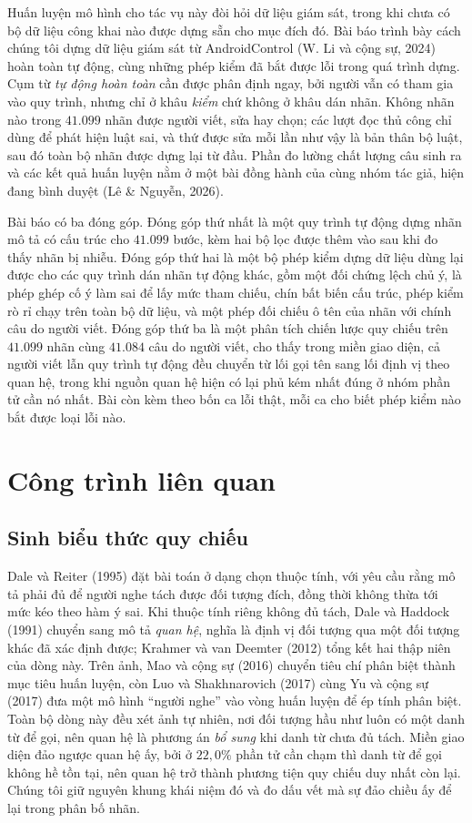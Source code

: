 \documentclass[12pt,a4paper,onecolumn]{article}
\newcommand{\ôvuông}[2]{\tikz[baseline=-0.45ex]{\draw[#1,line width=0.9pt,#2] (0,0) rectangle (0.34,0.18);}}
\begin{document}
Huấn luyện mô hình cho tác vụ này đòi hỏi dữ liệu giám sát, trong khi chưa có bộ dữ liệu
công khai nào được dựng sẵn cho mục đích đó. Bài báo trình bày cách chúng tôi dựng dữ liệu giám sát từ AndroidControl (W. Li và cộng sự, 2024) hoàn toàn tự động, cùng những
phép kiểm đã bắt được lỗi trong quá trình dựng. Cụm từ \emph{tự động hoàn toàn} cần được phân định ngay, bởi người vẫn có tham gia vào quy
trình, nhưng chỉ ở khâu \emph{kiểm} chứ không ở khâu dán nhãn.
Không nhãn nào trong $41.099$ nhãn được người viết, sửa hay chọn; các lượt đọc thủ công chỉ dùng để phát hiện luật sai, và thứ được sửa mỗi lần như vậy là bản thân bộ luật, sau đó
toàn bộ nhãn được dựng lại từ đầu. Phần đo lường chất lượng câu sinh ra và các kết quả
huấn luyện nằm ở một bài đồng hành của cùng nhóm tác giả, hiện đang bình duyệt (Lê \&
Nguyễn, 2026).

Bài báo có ba đóng góp. Đóng góp thứ nhất là một quy trình tự động dựng nhãn mô tả có cấu
trúc cho $41.099$ bước, kèm hai bộ lọc được thêm vào sau khi đo thấy nhãn bị nhiễu. Đóng góp thứ hai
là một bộ phép kiểm dựng dữ liệu dùng lại được cho các quy trình dán nhãn tự động khác,
gồm một đối chứng lệch chủ ý, là phép ghép cố ý làm sai để lấy mức tham chiếu, chín bất
biến cấu trúc, phép kiểm rò rỉ chạy trên toàn bộ dữ liệu, và một phép đối chiếu ô tên của
nhãn với chính câu do người viết. Đóng góp thứ ba là một phân tích chiến lược quy chiếu
trên $41.099$ nhãn cùng $41.084$ câu do người viết, cho thấy trong miền giao diện, cả người viết lẫn quy trình tự động
đều chuyển từ lối gọi tên sang lối định vị theo quan hệ, trong khi nguồn quan hệ hiện có
lại phủ kém nhất đúng ở nhóm phần tử cần nó nhất. Bài còn kèm theo bốn ca lỗi thật, mỗi ca cho biết phép kiểm nào bắt được loại lỗi nào.

\section{Công trình liên quan}
\label{sec:lienquan}

\subsection{Sinh biểu thức quy chiếu}
Dale và Reiter (1995) đặt bài toán ở dạng chọn thuộc tính, với yêu cầu rằng mô tả phải đủ
để người nghe tách được đối tượng đích, đồng thời không thừa tới mức kéo theo hàm ý sai. Khi thuộc tính
riêng không đủ tách, Dale và Haddock (1991) chuyển sang mô tả \emph{quan hệ}, nghĩa là định vị đối tượng qua một đối tượng khác đã xác định được; Krahmer và van Deemter (2012) tổng kết
hai thập niên của dòng này. Trên ảnh, Mao và cộng sự (2016) chuyển tiêu chí phân biệt
thành mục tiêu huấn luyện, còn Luo và Shakhnarovich (2017) cùng Yu và cộng sự (2017) đưa
một mô hình ``người nghe'' vào vòng huấn luyện để ép tính phân biệt. Toàn bộ dòng này đều xét ảnh tự nhiên, nơi đối tượng hầu như luôn có một danh từ để gọi, nên quan hệ là
phương án \emph{bổ sung} khi danh từ chưa đủ tách. Miền giao diện đảo ngược quan hệ ấy, bởi ở $22{,}0\%$ phần tử cần chạm thì danh từ để gọi
không hề tồn tại, nên quan hệ trở thành phương tiện quy chiếu duy nhất còn lại. Chúng tôi
giữ nguyên khung khái niệm đó và đo dấu vết mà sự đảo chiều ấy để lại trong phân bố nhãn.
\end{document}
